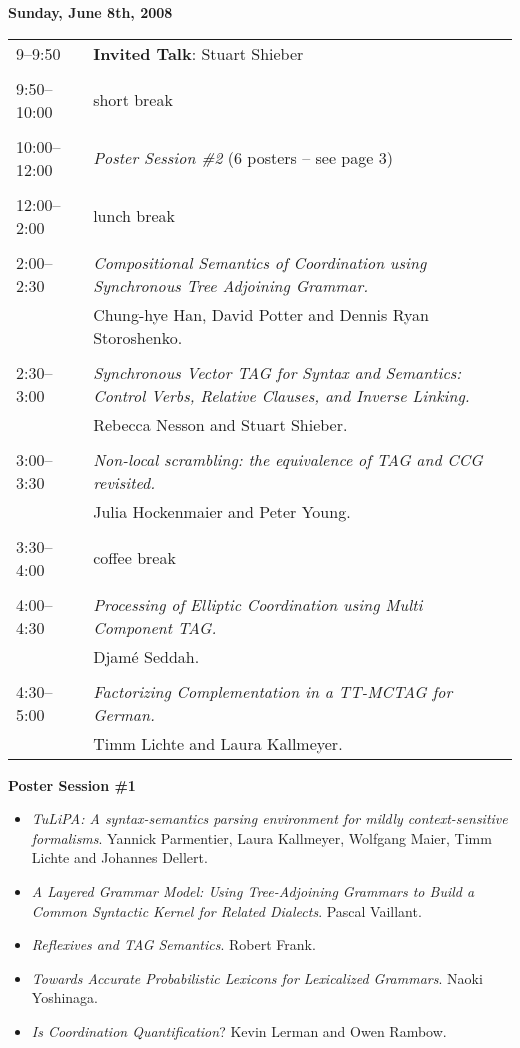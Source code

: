 \documentclass[12pt]{article}
\begin{document}
\newpage
\noindent \textbf{Sunday, June 8th, 2008}
\bigskip

\begin{tabular}{lp{5.2in}}
9--9:50 & \textbf{Invited Talk}: Stuart Shieber \\
& \\
9:50--10:00 & short break \\
& \\
10:00--12:00 & \textit{Poster Session \#2} (6 posters -- see page 3) \\
& \\
12:00--2:00 & lunch break \\
& \\
2:00--2:30 & \textit{Compositional Semantics of Coordination using Synchronous Tree Adjoining Grammar.} \\
& Chung-hye Han, David Potter and Dennis Ryan Storoshenko.  \\
& \\
2:30--3:00 & \textit{Synchronous Vector TAG for Syntax and Semantics: Control Verbs, Relative Clauses, and Inverse Linking.} \\
& Rebecca Nesson and Stuart Shieber.  \\
& \\
3:00--3:30 &  \textit{Non-local scrambling: the equivalence of TAG and CCG revisited.} \\
& Julia Hockenmaier and Peter Young. \\
& \\
3:30--4:00 & coffee break \\
& \\
4:00--4:30 & \textit{Processing of Elliptic Coordination using Multi Component TAG.} \\
& Djam\'{e} Seddah. \\
& \\
4:30--5:00 & \textit{Factorizing Complementation in a TT-MCTAG for German.} \\
& Timm Lichte and Laura Kallmeyer.
\end{tabular}
\bigskip

\newpage
\noindent \textbf{Poster Session \#1}

\begin{itemize}
\item \textit{TuLiPA: A syntax-semantics parsing environment for mildly context-sensitive formalisms}. Yannick Parmentier, Laura Kallmeyer, Wolfgang Maier, Timm Lichte and Johannes Dellert. 
\item \textit{A Layered Grammar Model: Using Tree-Adjoining Grammars to Build a Common Syntactic Kernel for Related Dialects}. Pascal Vaillant. 
\item \textit{Reflexives and TAG Semantics}. Robert Frank. 
\item \textit{Towards Accurate Probabilistic Lexicons for Lexicalized Grammars}. Naoki Yoshinaga. 
\item \textit{Is Coordination Quantification}? Kevin Lerman and Owen Rambow. 
\end{itemize}
\end{document}
